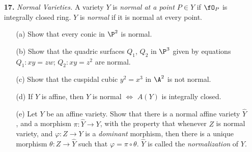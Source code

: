 \documentclass[a4paper]{article}
\begin{document}
\begin{enumerate} [label=\textbf{\arabic*.}, leftmargin=-0.05em]
\begin{proof}
\begin{itemize} [leftmargin=0cm]
        \item[(c)] Suppose we have morphisms $Z \to X$ and $Z \to Y$. This induces $k$-algebra homomorphisms $A(X) \to \fO(Z)$ and $A(Y) \to \fO(Z)$, which defines a $k$-bilinear map $A(X) \times A(Y) \to \fO(Z)$. By the universal property of tensor products, we have a unique $k$-algebra homomorphism $A(X) \otimes_k A(Y) \to \fO(W)$, hence we have a unique morphism $W \to X \times Y$.
        \[ \begin{tikzcd}
            \fO(Z) &                                        &                                        \\
                   & A(X) \otimes_k A(Y) \arrow[lu, dashed] & A(Y) \arrow[llu, bend right] \arrow[l] \\
                   & A(X) \arrow[luu, bend left] \arrow[u]  &                                       
            \end{tikzcd} \]
        
        \item[(d)] If $t_1, \dots, t_n$ and $u_1, \dots, u_m$ are coordinates for $X$ and $Y$, respectively, then each $t_i$, $u_j$ are algebraically independent in $A(X \times Y)$, that is the quotient field of $A(X \times Y)$ has transcendence degree $n + m$, hence $\dim{X \times Y} = \dim{X} + \dim{Y}$.
    \end{itemize}
\end{proof}

\item[\textbf{17.}] \textit{Normal Varieties.} A variety $Y$ is \textit{normal at a point $P \in Y$} if $\fO_P$ is integrally closed ring. $Y$ is \textit{normal} if it is normal at every point. 
\begin{itemize}
    \item[(a)] Show that every conic in $\P^2$ is normal.
    \item[(b)] Show that the quadric surfaces $Q_1$, $Q_2$ in $\P^3$ given by equations $Q_1 : xy = zw$; $Q_2 : xy = z^2$ are normal.
    \item[(c)] Show that the cuspidal cubic $y^2 = x^3$ in $\A^2$ is not normal.
    \item[(d)] If $Y$ is affine, then $Y$ is normal $\Leftrightarrow$ $A(Y)$ is integrally closed.
    \item[(e)] Let $Y$ be an affine variety. Show that there is a normal affine variety $\hat{Y}$, and a morphism $\pi : \hat{Y} \to Y$, with the property that whenever $Z$ is normal variety, and $\varphi :Z \to Y$ is a \textit{dominant} morphism, then there is a unique morphism $\theta : Z \to \hat{Y}$ such that $\varphi = \pi \circ \theta$. $\hat{Y}$ is called the \textit{normalization} of $Y$.
\end{itemize}


\end{enumerate}
\end{document}
